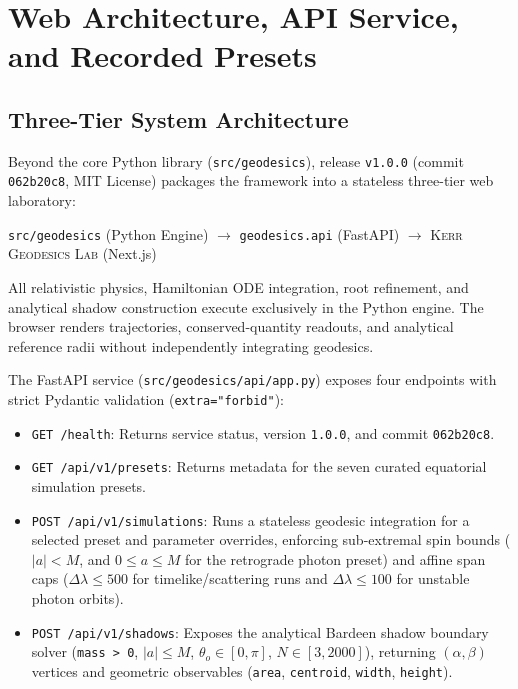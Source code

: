 \section{Web Architecture, API Service, and Recorded Presets}
\label{sec:web_architecture_and_presets}

\subsection{Three-Tier System Architecture}
Beyond the core Python library (\texttt{src/geodesics}), release \texttt{v1.0.0} (commit \texttt{062b20c8}, MIT License) packages the framework into a stateless three-tier web laboratory:
\begin{center}
\small
\texttt{src/geodesics} (Python Engine) $\longrightarrow$ \texttt{geodesics.api} (FastAPI) $\longrightarrow$ \textsc{Kerr Geodesics Lab} (Next.js)
\end{center}
All relativistic physics, Hamiltonian ODE integration, root refinement, and analytical shadow construction execute exclusively in the Python engine. The browser renders trajectories, conserved-quantity readouts, and analytical reference radii without independently integrating geodesics.

The FastAPI service (\texttt{src/geodesics/api/app.py}) exposes four endpoints with strict Pydantic validation (\texttt{extra="forbid"}):
\begin{itemize}
    \item \texttt{GET /health}: Returns service status, version \texttt{1.0.0}, and commit \texttt{062b20c8}.
    \item \texttt{GET /api/v1/presets}: Returns metadata for the seven curated equatorial simulation presets.
    \item \texttt{POST /api/v1/simulations}: Runs a stateless geodesic integration for a selected preset and parameter overrides, enforcing sub-extremal spin bounds ($|a| < M$, and $0 \le a \le M$ for the retrograde photon preset) and affine span caps ($\Delta\lambda \le 500$ for timelike/scattering runs and $\Delta\lambda \le 100$ for unstable photon orbits).
    \item \texttt{POST /api/v1/shadows}: Exposes the analytical Bardeen shadow boundary solver (\texttt{mass > 0}, $|a| \le M$, $\theta_o \in [0, \pi]$, $N \in [3, 2000]$), returning $(\alpha, \beta)$ vertices and geometric observables (\texttt{area}, \texttt{centroid}, \texttt{width}, \texttt{height}).
\end{itemize}

